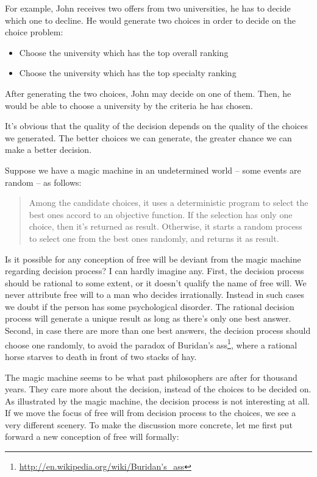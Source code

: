 For example, John receives two offers from two universities, he has to decide which one to decline. He would generate two choices in order to decide on the choice problem:

\begin{itemize}
\item Choose the university which has the top overall ranking
\item Choose the university which has the top specialty ranking
\end{itemize}

After generating the two choices, John may decide on one of them. Then, he would be able to choose a university by the criteria he has chosen.

It's obvious that the quality of the decision depends on the quality of the choices we generated. The better choices we can generate, the greater chance we can make a better decision.

Suppose we have a magic machine in an undetermined world  -- some events are random -- as follows:

\begin{quote}
Among the candidate choices, it uses a deterministic program to select the best ones accord to an objective function. If the selection has only one choice, then it's returned as result. Otherwise, it starts a random process to select one from the best ones randomly, and returns it as result.
\end{quote}

Is it possible for any conception of free will be deviant from the magic machine regarding decision process? I can hardly imagine any. First, the decision process should be rational to some extent, or it doesn't qualify the name of free will. We never attribute free will to a man who decides irrationally. Instead in such cases we doubt if the person has some psychological disorder. The rational decision process will generate a unique result as long as there's only one best answer. Second, in case there are more than one best answers, the decision process should choose one randomly, to avoid the paradox of Buridan's ass\footnote{\url{http://en.wikipedia.org/wiki/Buridan's_ass}}, where a rational horse starves to death in front of two stacks of hay.

The magic machine seems to be what past philosophers are after for thousand years. They care more about the decision, instead of the choices to be decided on. As illustrated by the magic machine, the decision process is not interesting at all. If we move the focus of free will from decision process to the choices, we see a very different scenery. To make the discussion more concrete, let me first put forward a new conception of free will formally:

